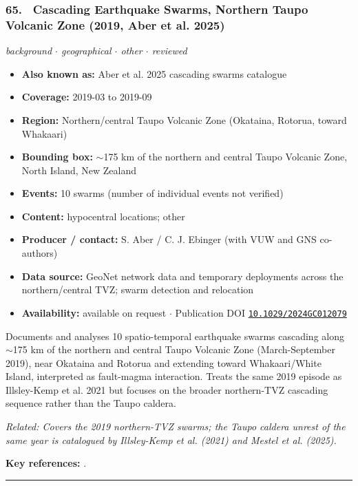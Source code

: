 \documentclass[10pt,a4paper]{article}
\newcommand{\catentryrule}{\par\vspace{3pt}\noindent\textcolor{rulegrey}{\rule{\linewidth}{0.3pt}}\par\vspace{5pt}}
\newcommand{\kv}[2]{\item \textbf{#1:} #2}
\begin{document}
\subsubsection*{\hypertarget{c:65}{65.}~ Cascading Earthquake Swarms, Northern Taupo Volcanic Zone (2019, Aber et al. 2025)}
{\small\itshape background $\cdot$ geographical $\cdot$ other $\cdot$ reviewed}\par\vspace{2pt}
\begin{itemize}[leftmargin=1.3em,itemsep=0.6pt,topsep=1pt,parsep=0pt]
\kv{Also known as}{Aber et al. 2025 cascading swarms catalogue}
\kv{Coverage}{2019-03 to 2019-09}
\kv{Region}{Northern/central Taupo Volcanic Zone (Okataina, Rotorua, toward Whakaari)}
\kv{Bounding box}{$\sim$175 km of the northern and central Taupo Volcanic Zone, North Island, New Zealand}
\kv{Events}{10 swarms (number of individual events not verified)}
\kv{Content}{hypocentral locations; other}
\kv{Producer / contact}{S. Aber / C. J. Ebinger (with VUW and GNS co-authors)}
\kv{Data source}{GeoNet network data and temporary deployments across the northern/central TVZ; swarm detection and relocation}
\kv{Availability}{available on request $\cdot$ Publication DOI \href{https://doi.org/10.1029/2024GC012079}{\nolinkurl{10.1029/2024GC012079}}}
\end{itemize}
\par\vspace{2pt}Documents and analyses 10 spatio-temporal earthquake swarms cascading along $\sim$175 km of the northern and central Taupo Volcanic Zone (March-September 2019), near Okataina and Rotorua and extending toward Whakaari/White Island, interpreted as fault-magma interaction. Treats the same 2019 episode as Illsley-Kemp et al. 2021 but focuses on the broader northern-TVZ cascading sequence rather than the Taupo caldera.
\par{\small\itshape Related: Covers the 2019 northern-TVZ swarms; the Taupo caldera unrest of the same year is catalogued by Illsley-Kemp et al. (2021) and Mestel et al. (2025).}
\par\vspace{2pt}\textbf{Key references:} \cite{Aber2025}.
\catentryrule
\end{document}
